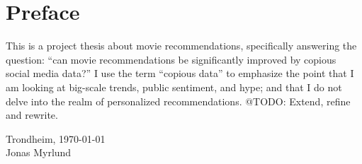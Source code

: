 \section*{Preface}
This is a project thesis about movie recommendations, specifically answering the question: ``can movie recommendations be significantly improved by copious social media data?'' I use the term ``copious data'' to emphasize the point that I am looking at big-scale trends, public sentiment, and hype; and that I do not delve into the realm of personalized recommendations. @TODO: Extend, refine and rewrite. \\[2cm]

\begin{center}
Trondheim, \today\\[3pc]
Jonas Myrlund
\end{center}